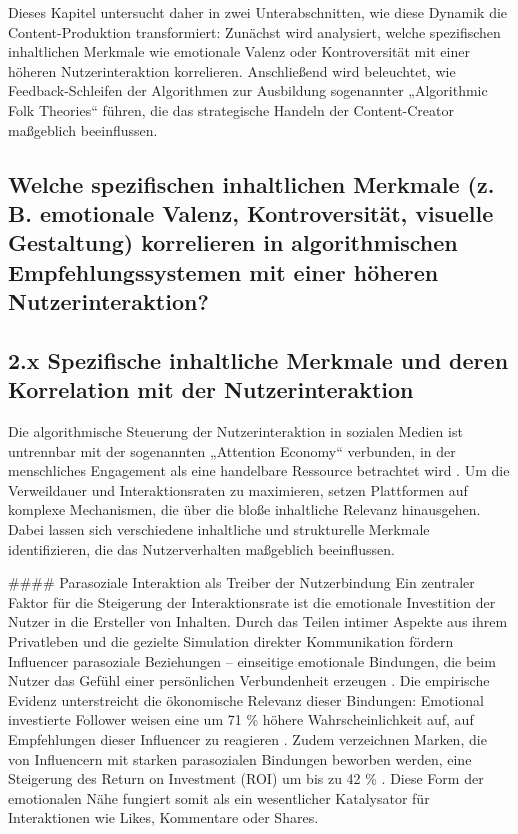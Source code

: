 \documentclass[11pt,a4paper]{article}
\begin{document}
Dieses Kapitel untersucht daher in zwei Unterabschnitten, wie diese Dynamik die Content-Produktion transformiert: Zunächst wird analysiert, welche spezifischen inhaltlichen Merkmale wie emotionale Valenz oder Kontroversität mit einer höheren Nutzerinteraktion korrelieren. Anschließend wird beleuchtet, wie Feedback-Schleifen der Algorithmen zur Ausbildung sogenannter „Algorithmic Folk Theories“ führen, die das strategische Handeln der Content-Creator maßgeblich beeinflussen.

\subsection{Welche spezifischen inhaltlichen Merkmale (z. B. emotionale Valenz, Kontroversität, visuelle Gestaltung) korrelieren in algorithmischen Empfehlungssystemen mit einer höheren Nutzerinteraktion?}

\subsection{2.x Spezifische inhaltliche Merkmale und deren Korrelation mit der Nutzerinteraktion}

Die algorithmische Steuerung der Nutzerinteraktion in sozialen Medien ist untrennbar mit der sogenannten „Attention Economy“ verbunden, in der menschliches Engagement als eine handelbare Ressource betrachtet wird \autocite{grey_grey_c53300ebd6e148168e8f94b0598a1792}. Um die Verweildauer und Interaktionsraten zu maximieren, setzen Plattformen auf komplexe Mechanismen, die über die bloße inhaltliche Relevanz hinausgehen. Dabei lassen sich verschiedene inhaltliche und strukturelle Merkmale identifizieren, die das Nutzerverhalten maßgeblich beeinflussen.

\#\#\#\# Parasoziale Interaktion als Treiber der Nutzerbindung Ein zentraler Faktor für die Steigerung der Interaktionsrate ist die emotionale Investition der Nutzer in die Ersteller von Inhalten. Durch das Teilen intimer Aspekte aus ihrem Privatleben und die gezielte Simulation direkter Kommunikation fördern Influencer parasoziale Beziehungen – einseitige emotionale Bindungen, die beim Nutzer das Gefühl einer persönlichen Verbundenheit erzeugen \autocite{grey_grey_5d5c282590c448fc8776b04f78a08de5}. Die empirische Evidenz unterstreicht die ökonomische Relevanz dieser Bindungen: Emotional investierte Follower weisen eine um 71 \% höhere Wahrscheinlichkeit auf, auf Empfehlungen dieser Influencer zu reagieren \autocite{grey_grey_5d5c282590c448fc8776b04f78a08de5}. Zudem verzeichnen Marken, die von Influencern mit starken parasozialen Bindungen beworben werden, eine Steigerung des Return on Investment (ROI) um bis zu 42 \% \autocite{grey_grey_5d5c282590c448fc8776b04f78a08de5}. Diese Form der emotionalen Nähe fungiert somit als ein wesentlicher Katalysator für Interaktionen wie Likes, Kommentare oder Shares.
\end{document}
